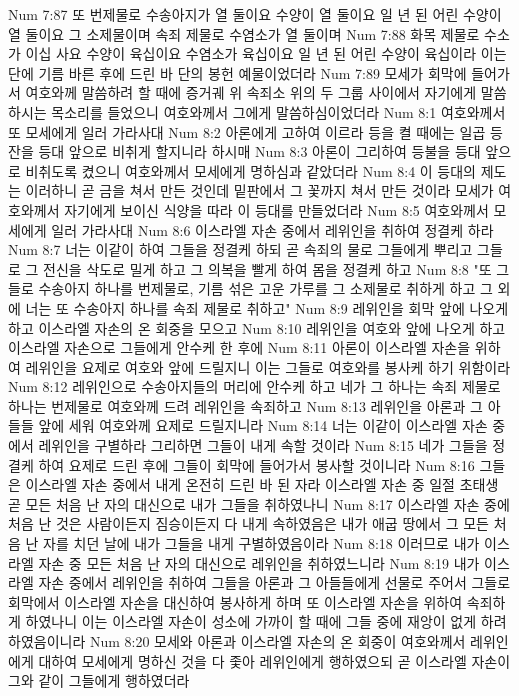 Num 7:87  또 번제물로 수송아지가 열 둘이요 수양이 열 둘이요 일 년 된 어린 수양이 열 둘이요 그 소제물이며 속죄 제물로 수염소가 열 둘이며
Num 7:88  화목 제물로 수소가 이십 사요 수양이 육십이요 수염소가 육십이요 일 년 된 어린 수양이 육십이라 이는 단에 기름 바른 후에 드린 바 단의 봉헌 예물이었더라
Num 7:89  모세가 회막에 들어가서 여호와께 말씀하려 할 때에 증거궤 위 속죄소 위의 두 그룹 사이에서 자기에게 말씀하시는 목소리를 들었으니 여호와께서 그에게 말씀하심이었더라
Num 8:1  여호와께서 또 모세에게 일러 가라사대
Num 8:2  아론에게 고하여 이르라 등을 켤 때에는 일곱 등잔을 등대 앞으로 비취게 할지니라 하시매
Num 8:3  아론이 그리하여 등불을 등대 앞으로 비취도록 켰으니 여호와께서 모세에게 명하심과 같았더라
Num 8:4  이 등대의 제도는 이러하니 곧 금을 쳐서 만든 것인데 밑판에서 그 꽃까지 쳐서 만든 것이라 모세가 여호와께서 자기에게 보이신 식양을 따라 이 등대를 만들었더라
Num 8:5  여호와께서 모세에게 일러 가라사대
Num 8:6  이스라엘 자손 중에서 레위인을 취하여 정결케 하라
Num 8:7  너는 이같이 하여 그들을 정결케 하되 곧 속죄의 물로 그들에게 뿌리고 그들로 그 전신을 삭도로 밀게 하고 그 의복을 빨게 하여 몸을 정결케 하고
Num 8:8  "또 그들로 수송아지 하나를 번제물로, 기름 섞은 고운 가루를 그 소제물로 취하게 하고 그 외에 너는 또 수송아지 하나를 속죄 제물로 취하고"
Num 8:9  레위인을 회막 앞에 나오게 하고 이스라엘 자손의 온 회중을 모으고
Num 8:10  레위인을 여호와 앞에 나오게 하고 이스라엘 자손으로 그들에게 안수케 한 후에
Num 8:11  아론이 이스라엘 자손을 위하여 레위인을 요제로 여호와 앞에 드릴지니 이는 그들로 여호와를 봉사케 하기 위함이라
Num 8:12  레위인으로 수송아지들의 머리에 안수케 하고 네가 그 하나는 속죄 제물로 하나는 번제물로 여호와께 드려 레위인을 속죄하고
Num 8:13  레위인을 아론과 그 아들들 앞에 세워 여호와께 요제로 드릴지니라
Num 8:14  너는 이같이 이스라엘 자손 중에서 레위인을 구별하라 그리하면 그들이 내게 속할 것이라
Num 8:15  네가 그들을 정결케 하여 요제로 드린 후에 그들이 회막에 들어가서 봉사할 것이니라
Num 8:16  그들은 이스라엘 자손 중에서 내게 온전히 드린 바 된 자라 이스라엘 자손 중 일절 초태생 곧 모든 처음 난 자의 대신으로 내가 그들을 취하였나니
Num 8:17  이스라엘 자손 중에 처음 난 것은 사람이든지 짐승이든지 다 내게 속하였음은 내가 애굽 땅에서 그 모든 처음 난 자를 치던 날에 내가 그들을 내게 구별하였음이라
Num 8:18  이러므로 내가 이스라엘 자손 중 모든 처음 난 자의 대신으로 레위인을 취하였느니라
Num 8:19  내가 이스라엘 자손 중에서 레위인을 취하여 그들을 아론과 그 아들들에게 선물로 주어서 그들로 회막에서 이스라엘 자손을 대신하여 봉사하게 하며 또 이스라엘 자손을 위하여 속죄하게 하였나니 이는 이스라엘 자손이 성소에 가까이 할 때에 그들 중에 재앙이 없게 하려 하였음이니라
Num 8:20  모세와 아론과 이스라엘 자손의 온 회중이 여호와께서 레위인에게 대하여 모세에게 명하신 것을 다 좇아 레위인에게 행하였으되 곧 이스라엘 자손이 그와 같이 그들에게 행하였더라
